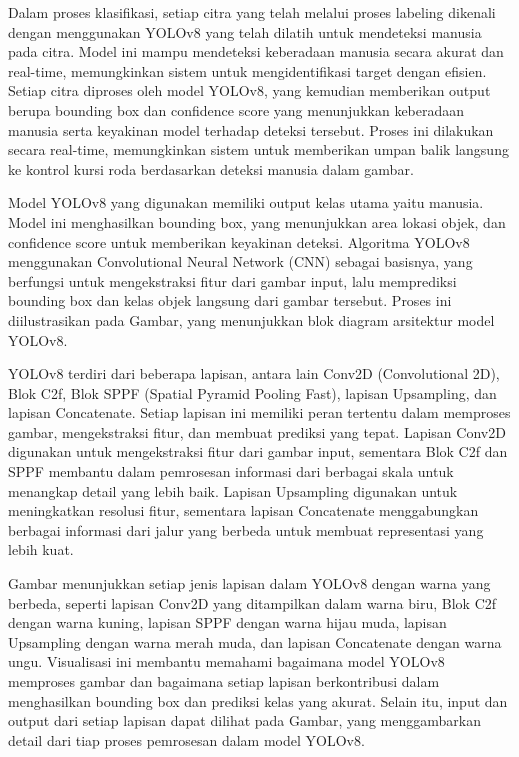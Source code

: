 Dalam proses klasifikasi, setiap citra yang telah melalui proses labeling dikenali dengan menggunakan YOLOv8 yang telah dilatih untuk mendeteksi manusia pada citra. Model ini mampu mendeteksi keberadaan manusia secara akurat dan real-time, memungkinkan sistem untuk mengidentifikasi target dengan efisien. Setiap citra diproses oleh model YOLOv8, yang kemudian memberikan output berupa bounding box dan confidence score yang menunjukkan keberadaan manusia serta keyakinan model terhadap deteksi tersebut. Proses ini dilakukan secara real-time, memungkinkan sistem untuk memberikan umpan balik langsung ke kontrol kursi roda berdasarkan deteksi manusia dalam gambar.

Model YOLOv8 yang digunakan memiliki output kelas utama yaitu manusia. Model ini menghasilkan bounding box, yang menunjukkan area lokasi objek, dan confidence score untuk memberikan keyakinan deteksi. Algoritma YOLOv8 menggunakan Convolutional Neural Network (CNN) sebagai basisnya, yang berfungsi untuk mengekstraksi fitur dari gambar input, lalu memprediksi bounding box dan kelas objek langsung dari gambar tersebut. Proses ini diilustrasikan pada Gambar, yang menunjukkan blok diagram arsitektur model YOLOv8.

YOLOv8 terdiri dari beberapa lapisan, antara lain Conv2D (Convolutional 2D), Blok C2f, Blok SPPF (Spatial Pyramid Pooling Fast), lapisan Upsampling, dan lapisan Concatenate. Setiap lapisan ini memiliki peran tertentu dalam memproses gambar, mengekstraksi fitur, dan membuat prediksi yang tepat. Lapisan Conv2D digunakan untuk mengekstraksi fitur dari gambar input, sementara Blok C2f dan SPPF membantu dalam pemrosesan informasi dari berbagai skala untuk menangkap detail yang lebih baik. Lapisan Upsampling digunakan untuk meningkatkan resolusi fitur, sementara lapisan Concatenate menggabungkan berbagai informasi dari jalur yang berbeda untuk membuat representasi yang lebih kuat.

Gambar menunjukkan setiap jenis lapisan dalam YOLOv8 dengan warna yang berbeda, seperti lapisan Conv2D yang ditampilkan dalam warna biru, Blok C2f dengan warna kuning, lapisan SPPF dengan warna hijau muda, lapisan Upsampling dengan warna merah muda, dan lapisan Concatenate dengan warna ungu. Visualisasi ini membantu memahami bagaimana model YOLOv8 memproses gambar dan bagaimana setiap lapisan berkontribusi dalam menghasilkan bounding box dan prediksi kelas yang akurat. Selain itu, input dan output dari setiap lapisan dapat dilihat pada Gambar, yang menggambarkan detail dari tiap proses pemrosesan dalam model YOLOv8.

